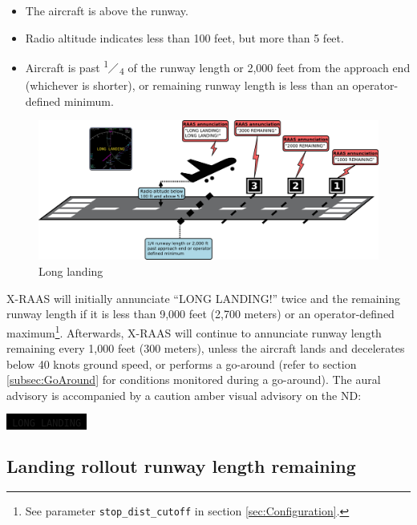 \documentclass[a4paper,12pt]{article}
\newcommand{\visualadvisory}[3][b]{%
    \ifthenelse{\equal{#1}{b}}{\begin{center}}{}
    \noindent
    \colorbox{black}{\textcolor{#2visualadvisorycolor}{\large\texttt{~#3~}}}
    \ifthenelse{\equal{#1}{b}}{\end{center}}{}}
\newcommand{\confopt}[1]{\texttt{#1}}
\newcommand{\myfrac}[2]{%
\textsuperscript{#1}\hspace{-0.4em}$\diagup$\hspace{-0.4em}\textsubscript{#2}}
\begin{document}
\begin{itemize}

\item The aircraft is above the runway.

\item Radio altitude indicates less than 100 feet, but more than 5 feet.

\item Aircraft is past \myfrac{1}{4} of the runway length or 2,000
feet from the approach end (whichever is shorter), or remaining runway
length is less than an operator-defined minimum.

\end{itemize}

\begin{figure}[H]
\begin{center}
\includegraphics[width=\textwidth]{../src/long_land.pdf}
\end{center}
\caption{Long landing}
\end{figure}

\noindent X-RAAS will initially annunciate ``LONG LANDING!'' twice and
the remaining runway length if it is less than 9,000 feet (2,700 meters)
or an operator-defined maximum\footnote{See parameter
\confopt{stop\_dist\_cutoff} in section \ref{sec:Configuration}.}.
Afterwards, X-RAAS will continue to annunciate runway length remaining
every 1,000 feet (300 meters), unless the aircraft lands and decelerates
below 40 knots ground speed, or performs a go-around (refer to section
\ref{subsec:GoAround} for conditions monitored during a go-around). The
aural advisory is accompanied by a caution amber visual advisory on the
ND:

\visualadvisory{nonroutine}{LONG LANDING}

\subsection{Landing rollout runway length remaining}
\label{subsec:LandRolloutMon}
\end{document}
